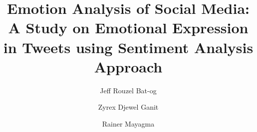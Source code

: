 
\title{Emotion Analysis of Social Media: A Study on Emotional Expression in Tweets using Sentiment Analysis Approach}
\author{Jeff Rouzel Bat-og \and Zyrex Djewel Ganit \and Rainer Mayagma}

\maketitle
